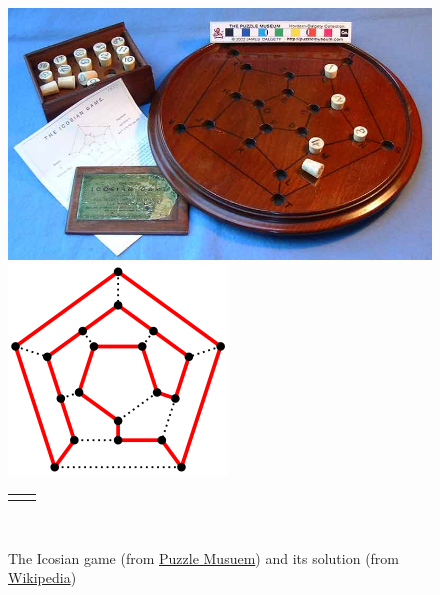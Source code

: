 \documentclass[10pt,]{book}
\theoremstyle{plain}
\theoremstyle{definition}
\theoremstyle{definition}
\theoremstyle{definition}
\theoremstyle{definition}
\numberwithin{equation}{section}
\newlength{\panelmax}
\begin{document}
\begin{figure}
\centering
{%
\setlength{\panelmax}{0pt}
\ifdefined\panelboxAimage\else\newsavebox{\panelboxAimage}\fi%
\begin{lrbox}{\panelboxAimage}
\includegraphics[width=0.4\linewidth]{images/icosiangame.jpg}
\end{lrbox}
\ifdefined\phAimage\else\newlength{\phAimage}\fi%
\setlength{\phAimage}{\ht\panelboxAimage+\dp\panelboxAimage}
\settototalheight{\phAimage}{\usebox{\panelboxAimage}}
\setlength{\panelmax}{\maxof{\panelmax}{\phAimage}}
\ifdefined\panelboxBimage\else\newsavebox{\panelboxBimage}\fi%
\begin{lrbox}{\panelboxBimage}
\includegraphics[width=0.4\linewidth]{images/icosiansolved.png}
\end{lrbox}
\ifdefined\phBimage\else\newlength{\phBimage}\fi%
\setlength{\phBimage}{\ht\panelboxBimage+\dp\panelboxBimage}
\settototalheight{\phBimage}{\usebox{\panelboxBimage}}
\setlength{\panelmax}{\maxof{\panelmax}{\phBimage}}
\leavevmode%
\setlength{\tabcolsep}{0.05\linewidth}
\par\medskip\noindent
\hspace*{0.05\linewidth}%
\begin{tabular}{@{}*{2}{c}@{}}
\begin{minipage}[c][\panelmax][c]{0.4\linewidth}\usebox{\panelboxAimage}\end{minipage}&
\begin{minipage}[c][\panelmax][c]{0.4\linewidth}\usebox{\panelboxBimage}\end{minipage}\end{tabular}\\
}%
\caption{The Icosian game (from \href{https://www.puzzlemuseum.com/month/picm02/200207icosian.htm}{Puzzle Musuem}) and its solution (from \href{https://en.wikipedia.org/wiki/Icosian_game}{Wikipedia})\label{figure-13}}
\end{figure}
\end{document}
